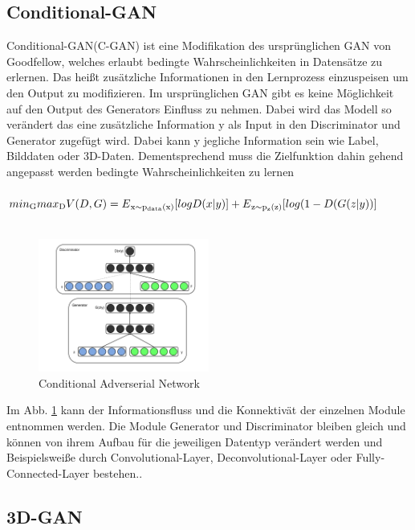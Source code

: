 \documentclass{llncs}
\begin{document}
\subsection{Conditional-GAN}

Conditional-GAN(C-GAN) ist eine Modifikation des ursprünglichen GAN von Goodfellow, welches erlaubt bedingte Wahrscheinlichkeiten in Datensätze zu erlernen. Das heißt zusätzliche Informationen in den Lernprozess einzuspeisen um den Output zu modifizieren. Im ursprünglichen GAN gibt es keine Möglichkeit auf den Output des Generators Einfluss zu nehmen. Dabei wird das Modell so verändert das eine zusätzliche Information y als Input in den Discriminator und Generator zugefügt wird. Dabei kann y jegliche Information sein wie Label, Bilddaten oder 3D-Daten. Dementsprechend muss die Zielfunktion dahin gehend angepasst werden bedingte Wahrscheinlichkeiten zu lernen
\\\\
\begin{math}
min\textsubscript{G} max\textsubscript{D}V(D,G)=E\textsubscript{x$\sim$p\textsubscript{data}(x)}[logD(x|y)]  + E\textsubscript{z$\sim$p\textsubscript{z}(z)}[log(1-D(G(z|y))]          
\end{math}
\\\\

\begin{figure}[htbp] 
	\centering
	\includegraphics[width=0.5\textwidth]{cgan.png}
	\caption{Conditional Adverserial Network\protect\cite{cgan}}
	\label{fig:Bild38}
\end{figure}
Im Abb. \ref{fig:Bild38} kann der Informationsfluss und die Konnektivät der einzelnen Module entnommen werden. Die Module Generator und Discriminator bleiben gleich und können von ihrem Aufbau für die jeweiligen Datentyp verändert werden und Beispielsweiße durch Convolutional-Layer, Deconvolutional-Layer oder Fully-Connected-Layer bestehen.\cite{cgan}.
\newpage
\subsection{3D-GAN}\label{sec:3dgan}
\end{document}
